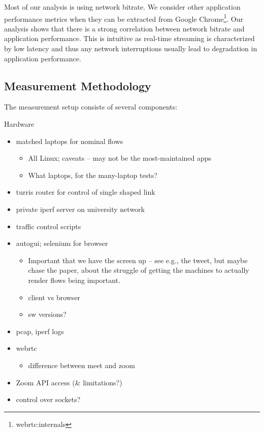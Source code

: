 Most of our analysis is using network bitrate. We consider other application performance metrics when they can be extracted from Google Chrome\footnote{webrtc:internals}. Our analysis shows that there is a strong correlation between network bitrate and application performance. This is intuitive as real-time streaming is characterized by low latency and thus any network interruptions usually lead to degradation in application performance. 

\subsection{Measurement Methodology}
  
The measurement setup consists of several components:

Hardware
\begin{itemize}
    \item matched laptops for nominal flows
          \begin{itemize}
              \item All Linux; caveats -- may not be the most-maintained apps
              \item What laptops, for the many-laptop tests?
          \end{itemize}
    \item turris router for control of single shaped link
    \item private iperf server on university network
\end{itemize}

\begin{itemize}
    \item traffic control scripts
    \item autogui; selenium for browser
          \begin{itemize}
              \item Important that we have the screen up -- see e.g., the tweet, but maybe chase the paper, about the struggle of getting the machines to actually render flows being important.
              \item client vs browser
              \item sw versions?
          \end{itemize}
    \item pcap, iperf logs
    \item webrtc
          \begin{itemize}
              \item difference between meet and zoom 
          \end{itemize}
    \item Zoom API access (\& limitations?)
    \item control over sockets?
\end{itemize}

